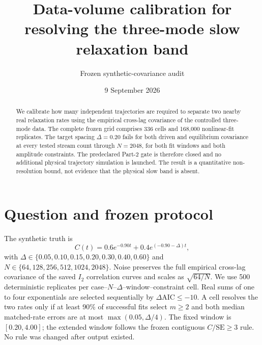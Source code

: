 \documentclass[10pt]{article}
\title{Data-volume calibration for resolving the three-mode slow relaxation band}
\author{Frozen synthetic-covariance audit}
\date{9 September 2026}
\begin{document}
\maketitle
\begin{abstract}
We calibrate how many independent trajectories are required to separate two nearby real relaxation rates using the empirical cross-lag covariance of the controlled three-mode data. The complete frozen grid comprises 336 cells and 168,000 nonlinear-fit replicates. The target spacing $\Delta=0.20$ fails for both driven and equilibrium covariance at every tested stream count through $N=2048$, for both fit windows and both amplitude constraints. The predeclared Part-2 gate is therefore closed and no additional physical trajectory simulation is launched. The result is a quantitative non-resolution bound, not evidence that the physical slow band is absent.
\end{abstract}
\section{Question and frozen protocol}
The synthetic truth is
\[C(t)=0.6e^{-0.90t}+0.4e^{(-0.90-\Delta)t},\]
with $\Delta\in\{0.05,0.10,0.15,0.20,0.30,0.40,0.60\}$ and $N\in\{64,128,256,512,1024,2048\}$. Noise preserves the full empirical cross-lag covariance of the saved $I_2$ correlation curves and scales as $\sqrt{64/N}$. We use 500 deterministic replicates per case--$N$--$\Delta$--window--constraint cell.
Real sums of one to four exponentials are selected sequentially by $\Delta\mathrm{AIC}\leq-10$. A cell resolves the two rates only if at least 90\% of successful fits select $m\geq2$ and both median matched-rate errors are at most $\max(0.05,\Delta/4)$. The fixed window is $[0.20,4.00]$; the extended window follows the frozen contiguous $C/\mathrm{SE}\geq3$ rule. No rule was changed after output existed.
\end{document}
